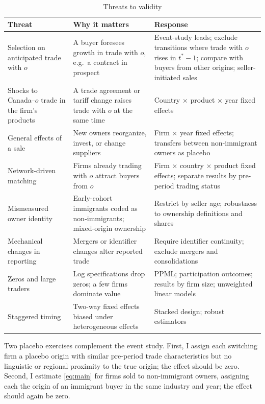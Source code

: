 \documentclass[12pt]{article}
\theoremstyle{remark}
\begin{document}
\begin{table}[htbp]\centering\footnotesize
\caption{Threats to validity}
\label{tab:threats}
\renewcommand{\arraystretch}{1.2}
\begin{tabularx}{\textwidth}{>{\raggedright\arraybackslash}p{3.2cm}YY}
\toprule
Threat & Why it matters & Response\\
\midrule
Selection on anticipated trade with $o$ & A buyer foresees growth in trade with $o$, e.g.\ a contract in prospect & Event-study leads; exclude transitions where trade with $o$ rises in $t^*-1$; compare with buyers from other origins; seller-initiated sales\\
Shocks to Canada--$o$ trade in the firm's products & A trade agreement or tariff change raises trade with $o$ at the same time & Country $\times$ product $\times$ year fixed effects\\
General effects of a sale & New owners reorganize, invest, or change suppliers & Firm $\times$ year fixed effects; transfers between non-immigrant owners as placebo\\
Network-driven matching & Firms already trading with $o$ attract buyers from $o$ & Firm $\times$ country $\times$ product fixed effects; separate results by pre-period trading status\\
Mismeasured owner identity & Early-cohort immigrants coded as non-immigrants; mixed-origin ownership & Restrict by seller age; robustness to ownership definitions and shares\\
Mechanical changes in reporting & Mergers or identifier changes alter reported trade & Require identifier continuity; exclude mergers and consolidations\\
Zeros and large traders & Log specifications drop zeros; a few firms dominate value & PPML; participation outcomes; results by firm size; unweighted linear models\\
Staggered timing & Two-way fixed effects biased under heterogeneous effects & Stacked design; robust estimators\\
\bottomrule
\end{tabularx}
\end{table}

Two placebo exercises complement the event study. First, I assign each
switching firm a placebo origin with similar pre-period trade characteristics
but no linguistic or regional proximity to the true origin; the effect should
be zero. Second, I estimate \eqref{eq:main} for firms sold to non-immigrant
owners, assigning each the origin of an immigrant buyer in the same industry
and year; the effect should again be zero.
\end{document}
